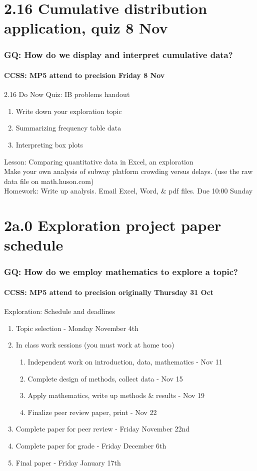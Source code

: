 \documentclass{beamer}
\begin{document}
\section{2.16 Cumulative distribution application, quiz 8 Nov}
\frame
{
  \frametitle{GQ: How do we display and interpret cumulative data?}
  \framesubtitle{CCSS: MP5 attend to precision \hfill \alert{Friday 8 Nov}}

  \begin{block}{2.16 Do Now Quiz: IB problems handout}
  \begin{enumerate}
      \item Write down your exploration topic 
      \item Summarizing frequency table data
      \item Interpreting box plots
  \end{enumerate}
  \end{block}
  Lesson: Comparing quantitative data in Excel, an exploration\\
  Make your own analysis of subway platform crowding versus delays. (use the raw data file on math.huson.com) \\ \smallskip
  Homework: Write up analysis. Email Excel, Word, \& pdf files. Due 10:00 Sunday
}

\section{2a.0 Exploration project paper schedule}
\frame
{
  \frametitle{GQ: How do we employ mathematics to explore a topic?}
  \framesubtitle{CCSS: MP5 attend to precision \hfill \alert{originally Thursday 31 Oct}}
  \begin{block}{Exploration: Schedule and deadlines}
    \begin{enumerate}
      \item Topic selection - Monday November 4th
      \item In class work sessions (you must work at home too)
      \begin{enumerate}
        \item Independent work on introduction, data, mathematics - Nov 11
        \item Complete design of methods, collect data - Nov 15
        \item Apply mathematics, write up methods \& results - Nov 19
        \item Finalize peer review paper, print - Nov 22
      \end{enumerate}
      \item Complete paper for peer review - Friday November 22nd
      \item Complete paper for grade - Friday December 6th
      \item Final paper - Friday January 17th
    \end{enumerate}
    \end{block}
}
\end{document}
